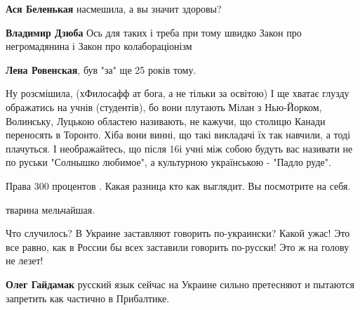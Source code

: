 \begin{itemize}
\begin{itemize}
\textbf{Ася Беленькая} насмешила, а вы значит здоровы?


\textbf{Владимир Дзюба}
Ось для таких і треба при тому швидко Закон про негромадянина і Закон про колабораціонізм


\textbf{Лена Ровенская}, був "за" ще 25 років тому.

\end{itemize}



Ну розсмішила, (хФилосафф ат бога, а не тільки за освітою) І ще хватає глузду
ображатись на учнів (студентів), бо вони плутають Мілан з Нью-Йорком,
Волинську, Луцькою областею називають, не кажучи, що столицю Канади переносять
в Торонто. Хіба вони винні, що такі викладачі їх так навчили, а тоді плачуться.
І неображайтесь, що після 16і учні між собою будуть вас називати не по руськи
"Солнышко любимое", а культурною українською - "Падло руде".



Права 300 процентов . Какая разница кто как выглядит. Вы посмотрите на себя.


тварина мельчайшая.



Что случилось? В Украине заставляют говорить по-украински? Какой ужас! Это все
равно, как в России бы всех заставили говорить по-русски! Это ж на голову не
лезет!

\begin{itemize}

\textbf{Олег Гайдамак} русский язык сейчас на Украине сильно претесняют и пытаются запретить как частично в Прибалтике.


\end{itemize}
\end{itemize}
